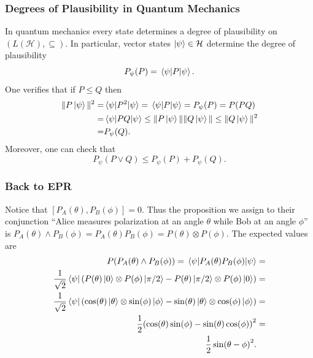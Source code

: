 \documentclass{beamer}
\begin{document}
\begin{frame}

	\frametitle{Degrees of Plausibility in Quantum Mechanics}
	
	In quantum mechanics every state determines a degree of plausibility on $(L(\mathcal{H}),\subseteq)$. In particular, vector states $\ket{\psi}\in\mathcal{H}$ determine the degree of plausibility
	\begin{equation}
		P_\psi(P)=\ev{P}{\psi}.
	\end{equation}
	One verifies that if $P\leq Q$ then
	\begin{align}
	\begin{split}
		\|P\ket{\psi}\|^2=&\ev{P^2}{\psi}=\ev{P}{\psi}=P_\psi(P)=P(PQ)\\
		=&\ev{PQ}{\psi}\leq\|P\ket{\psi}\|\|Q\ket{\psi}\|\leq\|Q\ket{\psi}\|^2\\
		=&P_\psi(Q).
	\end{split}
	\end{align}
	Moreover, one can check that
	\begin{equation}
		P_\psi(P\vee Q)\leq P_\psi(P)+P_\psi(Q).
	\end{equation}

\end{frame}

\begin{frame}

	\frametitle{Back to EPR}
	
	Notice that $[P_A(\theta),P_B(\phi)]=0$. Thus the proposition we assign to their conjunction ``Alice measures polarization at an angle $\theta$ while Bob at an angle $\phi$'' is $P_A(\theta)\wedge P_B(\phi)=P_A(\theta)P_B(\phi)=P(\theta)\otimes P(\phi)$. The expected values are
	\begin{align}
	\begin{split}
		P(P_A(\theta)\wedge P_B(\phi))=\ev{P_A(\theta)P_B(\phi)}{\psi}&=\\
		\frac{1}{\sqrt{2}}\bra{\psi}\qty(P(\theta)\ket{0}\otimes P(\phi)\ket{\pi/2}-P(\theta)\ket{\pi/2}\otimes P(\phi)\ket{0})&=\\
		\frac{1}{\sqrt{2}}\bra{\psi}\qty(\cos(\theta)\ket{\theta}\otimes \sin(\phi)\ket{\phi}-\sin(\theta)\ket{\theta}\otimes\cos(\phi)\ket{\phi})&=\\
		\frac{1}{2}\qty(\cos(\theta)\sin(\phi)-\sin(\theta)\cos(\phi))^2&=\\
		\frac{1}{2}\sin(\theta-\phi)^2.&
	\end{split}
	\end{align}

\end{frame}
\end{document}
